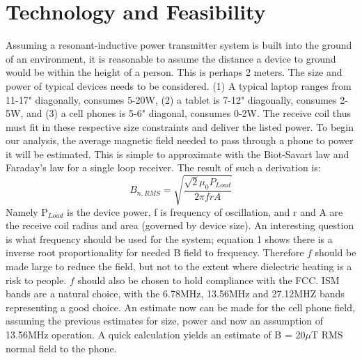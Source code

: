 \documentclass[11pt,letterpaper]{article}
\begin{document}
\section*{Technology and Feasibility}
Assuming a resonant-inductive power transmitter system is built into the ground of an environment, it is reasonable to assume the distance a device to ground would be within the height of a person. This is perhaps 2 meters. The size and power of typical devices needs to be considered. (1) A typical laptop ranges from 11-17" diagonally, consumes 5-20W, (2) a tablet is 7-12" diagonally, consumes 2-5W, and (3) a cell phones is 5-6" diagonal, consumes 0-2W. The receive coil thus must fit in these respective size constraints and deliver the listed power. To begin our analysis, the average magnetic field needed to pass through a phone to power it will be estimated. This is simple to approximate with the Biot-Savart law and Faraday's law for a single loop receiver. The result of such a derivation is:
\begin{equation}
	B_{n,RMS} = \sqrt{\frac{\sqrt{2}\mu_0 P_{Load}}{2\pi f r A }}
\end{equation}  
Namely P$_{Load}$ is the device power, f is frequency of oscillation, and r and A are the receive coil radius and area (governed by device size). An interesting question is what frequency should be used for the system; equation 1 shows there is a inverse root proportionality for needed B field to frequency. Therefore $f$ should be made large to reduce the field, but not to the extent where dielectric heating is a risk to people. $f$ should also be chosen to hold compliance with the FCC. ISM bands are a natural choice, with the 6.78MHz, 13.56MHz and 27.12MHZ bands representing a good choice. An estimate now can be made for the cell phone field, assuming the previous estimates for size, power and now an assumption of 13.56MHz operation. A quick calculation yields an estimate of B = 20$\mu$T RMS normal field to the phone. \\\par 
\end{document}
